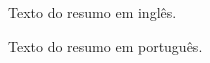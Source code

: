 
Texto do resumo em inglês.
~\\

\printkeys %


Texto do resumo em português.
~\\

\imprimirchaves %
